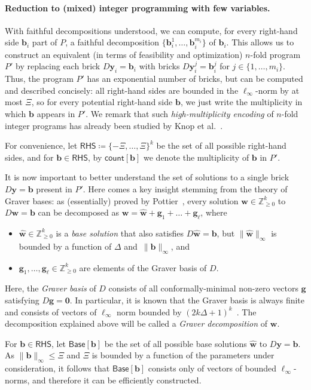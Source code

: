 \documentclass{theoretics}
\renewcommand{\leq}{\leqslant}
\renewcommand{\geq}{\geqslant}
\newcommand{\Z}{\mathbb{Z}}
\newcommand{\Zn}{\Z_{\geq 0}}
\newcommand{\tup}[1]{{\mathbf{#1}}}
\newcommand{\ww}{\tup w}
\newcommand{\whww}{{\widehat{\ww}}}
\newcommand{\yy}{\tup y}
\newcommand{\bb}{\tup b}
\renewcommand{\gg}{\tup g}
\newcommand{\RHS}{\mathsf{RHS}}
\newcommand{\Base}{\mathsf{Base}}
\newcommand{\cntTypes}{\mathsf{count}}
\begin{document}
\paragraph*{Reduction to (mixed) integer programming with few variables.} With faithful decompositions understood, we can compute, for every right-hand side $\bb_i$ part of $P$, a faithful decomposition $\{\bb^1_i,\ldots,\bb_i^{m_i}\}$ of $\bb_i$. This allows us to construct an equivalent (in terms of feasibility and optimization) $n$-fold program~$P'$ by replacing each brick $D\yy_i=\bb_i$ with bricks $D\yy_i^j=\bb_i^j$ for $j\in \{1,\ldots,m_i\}$. Thus, the program $P'$ has an exponential number of bricks, but can be computed and described concisely: all right-hand sides are bounded in the $\ell_\infty$-norm by at most $\Xi$, so for every potential right-hand side $\bb$, we just write the multiplicity in which $\bb$ appears in $P'$. We remark that such {\em{high-multiplicity encoding}} of $n$-fold integer programs has already been studied by Knop et al.~\cite{KnopKLMO23}.

For convenience, let $\RHS\coloneqq \{-\Xi,\ldots,\Xi\}^k$ be the set of all possible right-hand sides, and for $\bb\in \RHS$, by $\cntTypes[\bb]$ we denote the multiplicity of $\bb$ in $P'$.

It is now important to better understand the set of solutions to a single brick $D\yy=\bb$ present in $P'$. Here comes a key insight stemming from the theory of Graver bases: as (essentially) proved by Pottier~\cite{Pottier91}, every solution $\ww\in \Zn^k$ to $D\ww=\bb$ can be decomposed as $\ww=\whww+\gg_1+\ldots+\gg_\ell$, where
\begin{itemize}[nosep]
\item $\whww\in \Zn^k$ is a {\em{base solution}} that also satisfies $D\whww=\bb$, but $\|\whww\|_\infty$ is bounded by a function of $\Delta$ and~$\|\bb\|_\infty$, and
\item $\gg_1,\ldots,\gg_\ell\in \Zn^k$ are elements of the Graver basis of $D$.
\end{itemize}
Here, the {\em{Graver basis}} of $D$ consists of all conformally-minimal non-zero vectors $\gg$ satisfying $D\gg=\mathbf{0}$. In particular, it is known that the Graver basis is always finite and consists of vectors of $\ell_\infty$ norm bounded by $(2k\Delta+1)^k$~\cite{EisenbrandHK18}. The decomposition explained above will be called a {\em{Graver decomposition}} of $\ww$.

For $\bb\in \RHS$, let $\Base[\bb]$ be the set of all possible base solutions $\whww$ to $D\yy=\bb$. As $\|\bb\|_\infty\leq \Xi$ and $\Xi$ is bounded by a function of the parameters under consideration, it follows that $\Base[\bb]$ consists only of vectors of bounded $\ell_\infty$-norms, and therefore it can be efficiently constructed.
\end{document}

